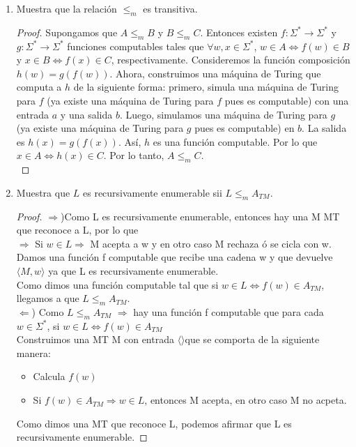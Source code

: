 \documentclass[letterpaper,10pt]{article}
\begin{document}
\begin{enumerate}
\begin{proof}
   	   \end{proof}
       \item Muestra que la relación $\leq_m$ es transitiva.
       \begin{proof}
           Supongamos que $A \leq_m B$ y $B \leq_m C$. Entonces existen
           $f : \Sigma^{*} \rightarrow \Sigma^{*}$ y 
           $g: \Sigma^{*} \rightarrow \Sigma^{*}$ funciones computables
           tales que $\forall w, x \in \Sigma^{*}$, 
           $w \in A \Longleftrightarrow f(w) \in B$ y 
           $x \in B \Longleftrightarrow f(x) \in C$, respectivamente.
           Consideremos la función composición $h(w) = g(f(w))$. Ahora,
           construimos una máquina de Turing que computa a $h$ de la siguiente
           forma: primero, simula una máquina de Turing para $f$ (ya existe una 
           máquina de Turing para $f$ pues es computable) con una entrada $a$ y
            una salida $b$. Luego, simulamos una máquina de Turing para $g$ 
            (ya existe una máquina de Turing para $g$ pues es computable) en 
           $b$. La salida es $h(x) = g(f(x))$. Así, $h$ es una función
           computable. Por lo que $x \in A \Longleftrightarrow h(x) \in C$.
           Por lo tanto, $A \leq_m C$.\\
       \end{proof}
      
       \item Muestra que $L$ es recursivamente enumerable sii $L \leq_m A_{TM}$.
       \begin{proof}
            $\Rightarrow$)Como L es recursivamente enumerable, entonces hay una M MT que reconoce a L, por lo que\\
            $\Rightarrow$ Si $w \in L \Rightarrow$ M acepta a w y en otro caso M rechaza ó se cicla con w.\\
            Damos una función f computable que recibe una cadena w y que devuelve $\langle M,w \rangle$ ya que L es recursivamente enumerable.\\
            Como dimos una función computable tal que si $w\in L \Leftrightarrow f(w)\in A_{TM}$, llegamos a que $L \leq_m A_{TM}$. \\
                
            $\Leftarrow$) Como $L \leq_m A_{TM}$ $\Rightarrow$ hay una función f computable que para cada $w \in \Sigma ^ * $, si $w\in L \Leftrightarrow f(w)\in A_{TM}$\\
            Construimos una MT M con entrada $\langle \rangle$que se comporta de la siguiente manera:
            \begin{itemize}
                \item Calcula $f(w)$
                \item Si $f(w)\in A_{TM} \Rightarrow w \in L$, entonces M acepta, en otro caso M no acpeta.
            \end{itemize}
            Como dimos una MT que reconoce L, podemos afirmar que L es recursivamente enumerable.
            

\end{proof}
\end{enumerate}
\end{document}
